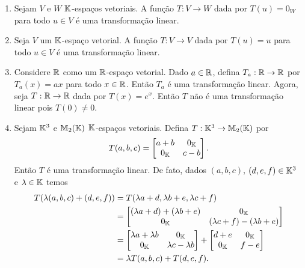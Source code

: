 \begin{exemplo}
	\begin{enumerate}[label={\arabic*})]
		\item Sejam $V$ e $W$ $\mathbb{K}$-espa\c{c}os vetoriais. A fun\c{c}\~ao $T : V \to W$ dada por $T(u) = 0_W$ para todo $u \in V$ \'e uma transforma\c{c}\~ao linear.

		\item Seja $V$ um $\mathbb{K}$-espa\c{c}o vetorial. A fun\c{c}\~ao $T : V \to V$ dada por $T(u) = u$ para todo $u \in V$ \'e uma transforma\c{c}\~ao linear.

		\item Considere $\mathbb{R}$ como um $\mathbb{R}$-espa\c{c}o vetorial. Dado $a \in \mathbb{R}$, defina $T_a : \mathbb{R} \to \mathbb{R}$ por $T_a(x) = ax$ para todo $x \in \mathbb{R}$. Ent\~ao $T_a$ \'e uma transforma\c{c}\~ao linear. Agora, seja $T : \mathbb{R} \to \mathbb{R}$ dada por $T(x) = e^x$. Ent\~ao $T$ n\~ao \'e uma transforma\c{c}\~ao linear pois $T(0) \ne 0$.

		\item Sejam $\mathbb{K}^3$ e $\mathbb{M}_2(\mathbb{K})$ $\mathbb{K}$-espa\c{c}os vetoriais. Defina $T : \mathbb{K}^3 \to \mathbb{M}_2(\mathbb{K})$ por
		\[
			T(a, b, c) = \begin{bmatrix}
				a+b & 0_{\mathbb{K}}\\
				0_{\mathbb{K}} & c - b
			\end{bmatrix}.
		\]
		Ent\~ao $T$ \'e uma transforma\c{c}\~ao linear. De fato, dados $(a, b, c)$, $(d, e, f) \in \mathbb{K}^3$ e $\lambda \in \mathbb{K}$ temos
		\begin{align*}
			T(\lambda(a,b,c) + (d,e,f)) &= T(\lambda a + d, \lambda b + e, \lambda c + f) \\ &= \begin{bmatrix}
				(\lambda a + d) + (\lambda b + e) & 0_{\mathbb{K}}\\
				0_{\mathbb{K}} & (\lambda c + f) - (\lambda b + e)
			\end{bmatrix} \\ &= \begin{bmatrix}
				\lambda a + \lambda b & 0_{\mathbb{K}}\\
				0_{\mathbb{K}} & \lambda c - \lambda b
			\end{bmatrix} + \begin{bmatrix}
				d + e & 0_{\mathbb{K}}\\
				0_{\mathbb{K}} & f - e
			\end{bmatrix} \\ &= \lambda T(a,b,c) + T(d,e,f).
		\end{align*}


\end{enumerate}
\end{exemplo}
